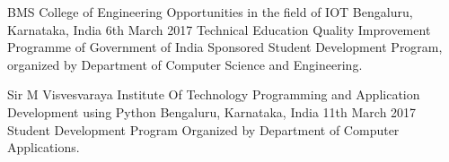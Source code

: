 \begin{cventries}
    \cventry
    {BMS College of Engineering} %
    {Opportunities in the field of IOT} %
    {Bengaluru, Karnataka, India} %
    {6th March 2017} %
    {Technical Education Quality Improvement Programme of Government of India Sponsored Student Development Program, organized by Department of Computer Science and Engineering.}
    
    \cventry
    {Sir M Visvesvaraya Institute Of Technology} %
    {Programming and Application Development using Python} %
    {Bengaluru, Karnataka, India} %
    {11th March 2017} %
    {Student Development Program Organized by Department of Computer Applications.}
    
    
\end{cventries}
